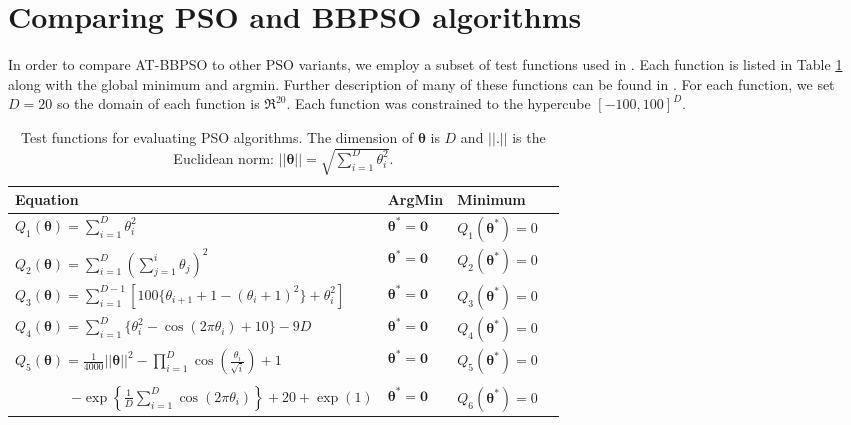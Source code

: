 \documentclass[cmbright]{staauth}
\begin{document}
\section{Comparing PSO and BBPSO algorithms}\label{app:psocompare}

In order to compare AT-BBPSO to other PSO variants, we employ a subset of test functions used in \cite{hsieh2010modified}. Each function is listed in Table \ref{tab:testfuns} along with the global minimum and argmin. Further description of many of these functions can be found in \cite{clerc2010particle}. For each function, we set $D=20$ so the domain of each function is $\Re^{20}$. Each function was constrained to the hypercube $[-100, 100]^D$.

\begin{table}[h]
\centering
\begin{tabular}{llll}
 Equation & ArgMin & Minimum \\\hline
 $Q_1(\bm{\theta}) = \sum_{i=1}^D\theta_i^2$ & $\bm{\theta}^* = \bm{0}$ & $Q_1(\bm{\theta}^*) = 0$  \\
 $Q_2(\bm{\theta}) = \sum_{i=1}^D\left(\sum_{j=1}^i \theta_j\right)^2 $ & $\bm{\theta}^* = \bm{0}$ & $Q_2(\bm{\theta}^*) = 0$ \\
 $Q_3(\bm{\theta}) = \sum_{i=1}^{D-1}\left[100\{\theta_{i+1} + 1 - (\theta_i + 1)^2\} + \theta_i^2\right]$ & $\bm{\theta}^* = \bm{0}$ & $Q_3(\bm{\theta}^*) = 0$ \\
 $Q_4(\bm{\theta}) = \sum_{i=1}^D\{\theta_i^2 - \cos(2\pi \theta_i) + 10\} - 9D$ & $\bm{\theta}^*=\bm{0}$ & $Q_4(\bm{\theta}^*) = 0$ \\
 $Q_5(\bm{\theta}) = \frac{1}{4000}||\bm{\theta}||^2 - \prod_{i=1}^D\cos\left(\frac{\theta_i}{\sqrt{i}}\right) + 1$ & $\bm{\theta}^* = \bm{0}$ & $Q_5(\bm{\theta}^*) = 0$ \\
 \shortstack[l]{$Q_6(\bm{\theta}) = -20\exp\left(-0.2\sqrt{\frac{1}{D}||\bm{\theta}||}\right)$ \\ \ \ \ \ \ \ \ \ $- \exp\left\{\frac{1}{D}\sum_{i=1}^D\cos(2\pi \theta_i)\right\} + 20 + \exp(1)$} & $\bm{\theta}^* = \bm{0}$ & $Q_6(\bm{\theta}^*) = 0$ \\\hline
\end{tabular}
\caption{Test functions for evaluating PSO algorithms. The dimension of $\bm{\theta}$ is $D$ and $||.||$ is the Euclidean norm: $||\bm{\theta}|| = \sqrt{\sum_{i=1}^D\theta_i^2}$.}
\label{tab:testfuns}
\end{table}
\end{document}
